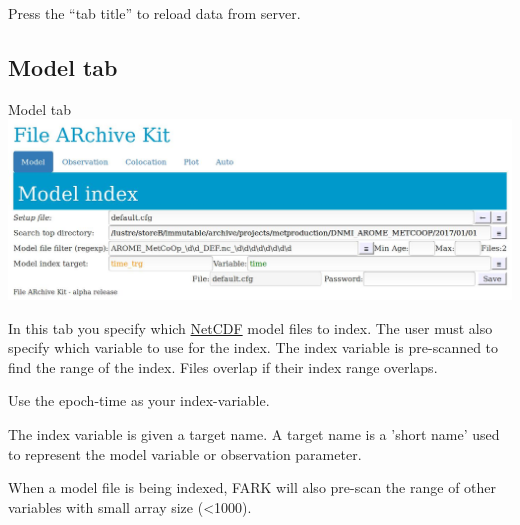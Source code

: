 \documentclass[letterpaper,10pt,twoside,twocolumn,openany]{book}
\begin{document}
\begin{quotebox}
Press the ``tab title'' to reload data from server.
\end{quotebox}

\subsection{Model tab}

\begin{paperbox}{Model tab}
  \includegraphics[width=\columnwidth]{fark_model.jpg}
\end{paperbox}
In this tab you specify which \hyperlink{netcdf}{NetCDF} model files to index.
The user must also specify which variable to use for the index.
The index variable is pre-scanned to find the range of the index.
Files overlap if their index range overlaps.
\begin{quotebox}
Use the epoch-time as your index-variable.
\end{quotebox}

The index variable is given a target name.
A target name is a 'short name' used to
represent the model variable or observation 
parameter.

When a model file is being indexed, FARK will also pre-scan the range of other 
variables with small array size (<1000).
\end{document}
